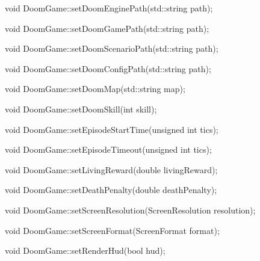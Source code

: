 \begin{clinee}
void DoomGame::setDoomEnginePath(std::string path);
\end{clinee}


\begin{clinee}
void DoomGame::setDoomGamePath(std::string path);
\end{clinee}


\begin{clinee}
void DoomGame::setDoomScenarioPath(std::string path);
\end{clinee}


\begin{clinee}
void DoomGame::setDoomConfigPath(std::string path);
\end{clinee}


\begin{clinee}
void DoomGame::setDoomMap(std::string map);
\end{clinee}
	

\begin{clinee}      
void DoomGame::setDoomSkill(int skill);
\end{clinee}
	

\begin{clinee}    
void DoomGame::setEpisodeStartTime(unsigned int tics);
\end{clinee}


\begin{clinee}
void DoomGame::setEpisodeTimeout(unsigned int tics);
\end{clinee}


\begin{clinee}
void DoomGame::setLivingReward(double livingReward);
\end{clinee}


\begin{clinee}
void DoomGame::setDeathPenalty(double deathPenalty);
\end{clinee}
	

\begin{clinee}
void DoomGame::setScreenResolution(ScreenResolution resolution);
\end{clinee}


\begin{clinee}
void DoomGame::setScreenFormat(ScreenFormat format);
\end{clinee}
	

\begin{clinee}       
void DoomGame::setRenderHud(bool hud);
\end{clinee}


